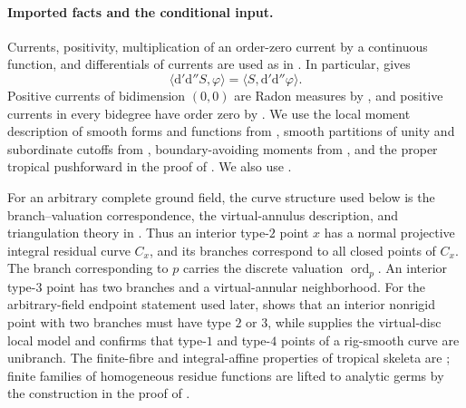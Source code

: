 
\paragraph{Imported facts and the conditional input.}
Currents, positivity, multiplication of an order-zero current by a
continuous function, and differentials of currents are used as in
\cite[\S\S7.1--7.2, Example~7.2.12, and \S7.7]{CLD25}.  In particular,
\cite[Lemma~7.7.5]{CLD25} gives
\begin{equation}
\label{eq:p21p3-gfc-transpose-dd}
 \bigl\langle \mathrm d'\mathrm d''S,\varphi\bigr\rangle
 =
 \bigl\langle S,\mathrm d'\mathrm d''\varphi\bigr\rangle .
\end{equation}
Positive currents of bidimension $(0,0)$ are Radon measures by
\cite[Proposition~7.2.8]{CLD25}, and positive currents in every bidegree
have order zero by \cite[Proposition~7.2.9]{CLD25}.  We use the local
moment description of smooth forms and functions from
\cite[Proposition~15.1.1(b) and Corollary~15.1.2]{CLD25}, smooth
partitions of unity and subordinate cutoffs from
\cite[Corollary~15.2.4, Proposition~15.2.8, and
Corollary~15.2.9]{CLD25}, boundary-avoiding moments from
\cite[Lemma~12.3.6]{CLD25}, and the proper tropical pushforward in the
proof of \cite[Theorem~16.8.5]{CLD25}.  We also use
\cite[Proposition~3.3.6, Lemma~12.3.6, Theorem~12.2.4,
Corollary~12.2.5, \S14.3.2, Lemma~14.3.4,
Proposition~14.4.2, \S16.6, and Proposition~16.6.3]{CLD25}.

For an arbitrary complete ground field, the curve structure used below is
the branch--valuation correspondence, the virtual-annulus description,
and triangulation theory in
\cite[\S\S3.3.5.2, 4.2.6, 4.2.9, 4.2.10--4.2.11, and
4.3.9--4.3.10]{Ducros24CurveStructure}.  Thus an interior
type-$2$ point $x$ has a normal projective integral residual curve
$C_x$, and its branches correspond to all closed points of $C_x$.
The branch corresponding to $p$ carries the discrete valuation
$\operatorname{ord}_p$.  An interior type-$3$ point has two branches
and a virtual-annular neighborhood.  For the arbitrary-field endpoint
statement used later, \cite[Theorem~4.2.5]{Ducros24CurveStructure}
shows that an interior nonrigid point with two branches must have type
$2$ or $3$, while \cite[Theorem~4.5.4, especially \S4.5.4.1, and
\S4.5.19.1]{Ducros24CurveStructure} supplies the virtual-disc local
model and confirms that type-$1$ and type-$4$ points of a rig-smooth
curve are unibranch.  The finite-fibre and integral-affine
properties of tropical skeleta are
\cite[Corollary~3.18 and Remark~3.20]{GJR26}; finite families of
homogeneous residue functions are lifted to analytic germs by the
construction in the proof of \cite[Lemma~6.14]{GJR26}.

